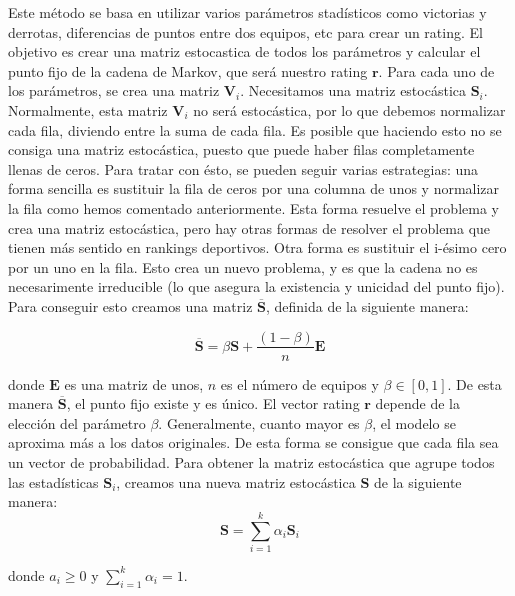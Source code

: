 Este método se basa en utilizar varios parámetros stadísticos como victorias y derrotas, diferencias de puntos entre dos equipos, etc para crear un rating. El objetivo es crear una matriz estocastica de todos los parámetros y calcular el punto fijo de la cadena de Markov, que será nuestro rating $\mathbf{r}$. Para cada uno de los parámetros, se crea una matriz $\mathbf{V}_i$. Necesitamos una matriz estocástica $\mathbf{S}_i$. Normalmente, esta matriz $\mathbf{V}_i$ no será estocástica, por lo que debemos normalizar cada fila, diviendo entre la suma de cada fila. Es posible que haciendo esto no se consiga una matriz estocástica, puesto que puede haber filas completamente llenas de ceros. Para tratar con ésto, se pueden seguir varias estrategias: una forma sencilla es sustituir la fila de ceros por una columna de unos y normalizar la fila como hemos comentado anteriormente. Esta forma resuelve el problema y crea una matriz estocástica, pero hay otras formas de resolver el problema que tienen más sentido en rankings deportivos.  Otra forma es sustituir el i-ésimo cero por un uno en la fila. Esto crea un nuevo problema, y es que la cadena no es necesarimente irreducible (lo que asegura la existencia y unicidad del punto fijo). Para conseguir esto creamos una matriz $\overline{\mathbf{S}}$, definida de la siguiente manera:

\begin{equation}
\overline{\mathbf{S}} = \beta \mathbf{S} + \dfrac{(1 - \beta)}{n} \mathbf{E}
\end{equation}

donde $\mathbf{E}$ es una matriz de unos, $n$ es el número de equipos y $\beta \in [0, 1]$. De esta manera $\overline{\mathbf{S}}$, el punto fijo existe y es único. El vector rating $\mathbf{r}$ depende de la elección del parámetro $\beta$. Generalmente, cuanto mayor es $\beta$, el modelo se aproxima más a los datos originales.  
De esta forma se consigue que cada fila sea un vector de probabilidad. Para obtener la matriz estocástica que agrupe todos las estadísticas $\mathbf{S}_i$, creamos una nueva matriz estocástica $\mathbf{S}$ de la siguiente manera: 
\begin{equation}
\mathbf{S} = \sum_{i=1}^{k} \alpha_i \mathbf{S}_i
\end{equation}

donde $a_i \geq 0$ y $\sum_{i=1}^{k} \alpha_i = 1$. 

